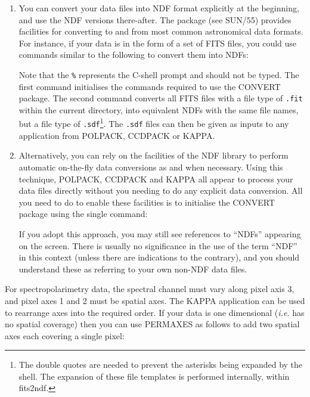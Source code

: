 \documentclass[twoside,11pt]{starlink}
\begin{document}
\begin{enumerate}

\item You can convert your data files into NDF format explicitly at the
beginning, and use the NDF versions there-after. The 
package (see SUN/55) provides facilities for converting to and
from most common astronomical data formats. For instance, if your data is
in the form of a set of FITS files, you could use commands similar to the
following to convert them into NDFs:

\begin{terminalv}
\end{terminalv}

Note that the \texttt{\%} represents the C-shell prompt and should not be typed.
The first command initialises the commands required to use the CONVERT
package. The second command converts all FITS files with a file type of
\verb+.fit+ within the current directory, into equivalent NDFs with the
same file names, but a file type of \verb+.sdf+\footnote{The double quotes
are needed to prevent the asterisks being expanded by the shell. The
expansion of these file templates is performed internally, within
fits2ndf.}. The \verb+.sdf+ files can then be given as inputs to
any application from POLPACK, CCDPACK or KAPPA.

\item Alternatively, you can rely on the facilities of the NDF library to perform
automatic on-the-fly data conversions as and when necessary. Using this
technique, POLPACK, CCDPACK and KAPPA all appear to process your data files
directly without you needing to do any explicit data conversion. All you
need to do to enable these facilities is to initialise the CONVERT
package using the single command:

\begin{terminalv}
\end{terminalv}

If you adopt this approach, you may still see references to ``NDFs''
appearing on the screen. There is usually no significance in the use of
the term ``NDF'' in this context (unless there are indications to the
contrary), and you should understand these as referring to your own
non-NDF data files.

\end{enumerate}

For spectropolarimetry data, the spectral channel must vary along pixel
axis 3, and pixel axes 1 and 2 must be spatial axes. The KAPPA
application  can be used to rearrange
axes into the required order. If your data is one dimensional
(\emph{i.e.} has no spatial coverage) then you can use PERMAXES as
follows to add two spatial axes each covering a single pixel:
\end{document}

